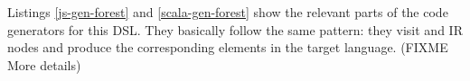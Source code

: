 \documentclass[preprint]{sigplanconf}
\newcommand{\eg}{\emph{e.g.}}
\begin{document}
Listings \ref{js-gen-forest} and \ref{scala-gen-forest} show the relevant parts of the code generators for this DSL.
They basically follow the same pattern: they visit  and  IR nodes and produce the corresponding
elements in the target language. (FIXME More details)

% 
% 
% 
% 
% 
% 
% 
\end{document}
